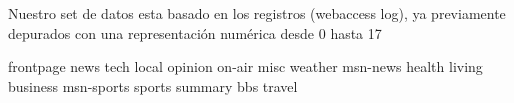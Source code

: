 	Nuestro set de  datos esta basado en los registros (webaccess log), ya previamente depurados con una representación numérica desde 0 hasta 17 

	frontpage news tech local opinion on-air misc weather msn-news health living business msn-sports sports summary bbs travel
















